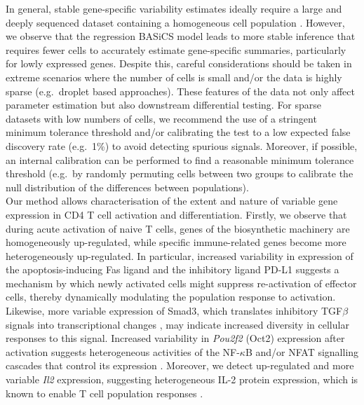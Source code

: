 In general, stable gene-specific variability estimates ideally require a large and deeply sequenced dataset containing a homogeneous cell population \citep[the use of unique molecular identifiers for quantifying transcript counts can also improve variability estimation, see][]{Grun2014}. However, we observe that the regression BASiCS model leads to more stable inference that requires fewer cells to accurately estimate gene-specific summaries, particularly for lowly expressed genes. Despite this, careful considerations should be taken in extreme scenarios where the number of cells is small and/or the data is highly sparse (e.g.~droplet based approaches). These features of the data not only affect parameter estimation but also downstream differential testing. For sparse datasets with low numbers of cells, we recommend the use of a stringent minimum tolerance threshold and/or calibrating the test to a low expected false discovery rate (e.g.~1\%) to avoid detecting spurious signals. Moreover, if possible, an internal calibration can be performed to find a reasonable minimum tolerance threshold (e.g.~by randomly permuting cells between two groups to calibrate the null distribution of the differences between populations). \\

Our method allows characterisation of the extent and nature of variable gene expression in CD4\plus{} T cell activation and differentiation. Firstly, we observe that during acute activation of naive T cells, genes of the biosynthetic machinery are homogeneously up-regulated, while specific immune-related genes become more heterogeneously up-regulated. In particular, increased variability in expression of the apoptosis-inducing Fas ligand \citep{Strasser2009} and the inhibitory ligand PD-L1 \citep{Chikuma2016} suggests a mechanism by which newly activated cells might suppress re-activation of effector cells, thereby dynamically modulating the population response to activation. Likewise, more variable expression of Smad3, which translates inhibitory TGF$\beta$ signals into transcriptional changes \citep{Delisle2013}, may indicate increased diversity in cellular responses to this signal. Increased variability in \textit{Pou2f2} (Oct2) expression after activation suggests heterogeneous activities of the NF-$\kappa$B and/or NFAT signalling cascades that control its expression \citep{Mueller2013}.
Moreover, we detect up-regulated and more variable \textit{Il2} expression, suggesting heterogeneous IL-2 protein expression, which is known to enable T cell population responses \citep{Fuhrmann2016}. \\

